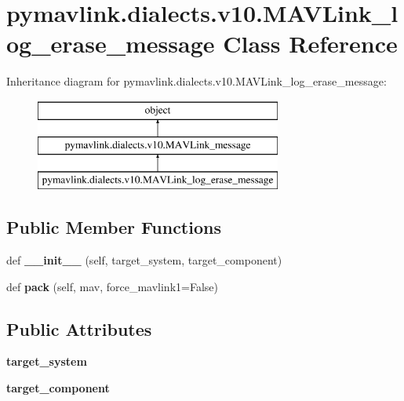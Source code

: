\hypertarget{classpymavlink_1_1dialects_1_1v10_1_1MAVLink__log__erase__message}{}\section{pymavlink.\+dialects.\+v10.\+M\+A\+V\+Link\+\_\+log\+\_\+erase\+\_\+message Class Reference}
\label{classpymavlink_1_1dialects_1_1v10_1_1MAVLink__log__erase__message}
Inheritance diagram for pymavlink.\+dialects.\+v10.\+M\+A\+V\+Link\+\_\+log\+\_\+erase\+\_\+message\+:\begin{figure}[H]
\begin{center}
\leavevmode
\includegraphics[height=3.000000cm]{classpymavlink_1_1dialects_1_1v10_1_1MAVLink__log__erase__message}
\end{center}
\end{figure}
\subsection*{Public Member Functions}
\begin{DoxyCompactItemize}
\item 
\mbox{\label{classpymavlink_1_1dialects_1_1v10_1_1MAVLink__log__erase__message_a14e59e5357f4a983b89001babd428a54}} 
def {\bfseries \+\_\+\+\_\+init\+\_\+\+\_\+} (self, target\+\_\+system, target\+\_\+component)
\item 
\mbox{\label{classpymavlink_1_1dialects_1_1v10_1_1MAVLink__log__erase__message_aaa804a4eb5cbcfc9c0428731ebc2aca4}} 
def {\bfseries pack} (self, mav, force\+\_\+mavlink1=False)
\end{DoxyCompactItemize}
\subsection*{Public Attributes}
\begin{DoxyCompactItemize}
\item 
\mbox{\label{classpymavlink_1_1dialects_1_1v10_1_1MAVLink__log__erase__message_adbd27e7a80072ae4ac363550a0f061e7}} 
{\bfseries target\+\_\+system}
\item 
\mbox{\label{classpymavlink_1_1dialects_1_1v10_1_1MAVLink__log__erase__message_ae6ae91ecdf4ad975de159e1750af9c79}} 
{\bfseries target\+\_\+component}
\end{DoxyCompactItemize}
